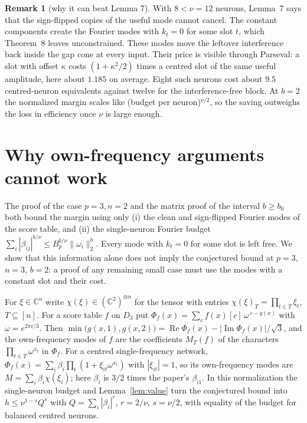 \documentclass[11pt]{article}
\theoremstyle{definition}
\newtheorem{remark}[theorem]{Remark}
\newcommand{\C}{\mathbb{C}}
\begin{document}
\begin{remark}[why it can beat Lemma 7]
With $8<\nu=12$ neurons, Lemma~7 says that the sign-flipped copies of the useful mode cannot cancel. The constant
components create the Fourier modes with $k_t=0$ for some slot $t$, which Theorem~8 leaves unconstrained. These
modes move the leftover interference back inside the gap cone at every input. Their price is visible through
Parseval: a slot with offset $\kappa$ costs $(1+\kappa^2/2)$ times a centred slot of the same useful amplitude,
here about $1.185$ on average. Eight such neurons cost about $9.5$ centred-neuron equivalents against twelve for
the interference-free block. At $b=2$ the normalized margin scales like
(budget per neuron)$^{\nu/2}$, so the saving outweighs the loss in efficiency once $\nu$ is large enough.
\end{remark}

\section{Why own-frequency arguments cannot work}\label{sec:barrier}

The proof of the case $p=3,n=2$ and the matrix proof of the interval $b\ge b_0$ both bound the margin using
only (i) the clean and sign-flipped Fourier modes of the score table, and (ii) the single-neuron Fourier budget
$\sum_{i}|\beta_{ij}|^{b/\nu}\le B_p^{b/\nu}\|\omega_i\|_2^b$. Every mode with $k_t=0$ for some slot is left free.
We show that this information alone does not imply the conjectured bound at $p=3$, $n=3$, $b=2$: a proof of
any remaining small case must use the modes with a constant slot and their cost.

For $\xi\in\C^n$ write $\chi(\xi)\in(\C^2)^{\otimes n}$ for the tensor with entries $\chi(\xi)_T=\prod_{t\in T}\xi_t$,
$T\subseteq[n]$. For a score table $f$ on $D_3$ put $\Phi_f(x)=\sum_c f(x)[c]\,\omega^{\,c-y(x)}$ with $\omega=e^{2\pi i/3}$.
Then $\min\big(g(x,1),g(x,2)\big)=\operatorname{Re}\Phi_f(x)-|\operatorname{Im}\Phi_f(x)|/\sqrt3$, and the own-frequency modes of
$f$ are the coefficients $M_T(f)$ of the characters $\prod_{t\in T}\omega^{x_t}$ in $\Phi_f$. For a centred
single-frequency network, $\Phi_f(x)=\sum_i\beta_i\prod_t(1+\xi_{it}\omega^{x_t})$ with $|\xi_{it}|=1$, so its own-frequency
modes are $M=\sum_i\beta_i\chi(\xi_i)$; here $\beta_i$ is $3/2$ times the paper's $\beta_{i1}$. In this normalization
the single-neuron budget and Lemma~\ref{lem:value} turn the conjectured bound into
$h\le\nu^{1-s}Q^{s}$ with $Q=\sum_i|\beta_i|^{r}$, $r=2/\nu$, $s=\nu/2$, with equality of the budget for balanced
centred neurons.
\end{document}
